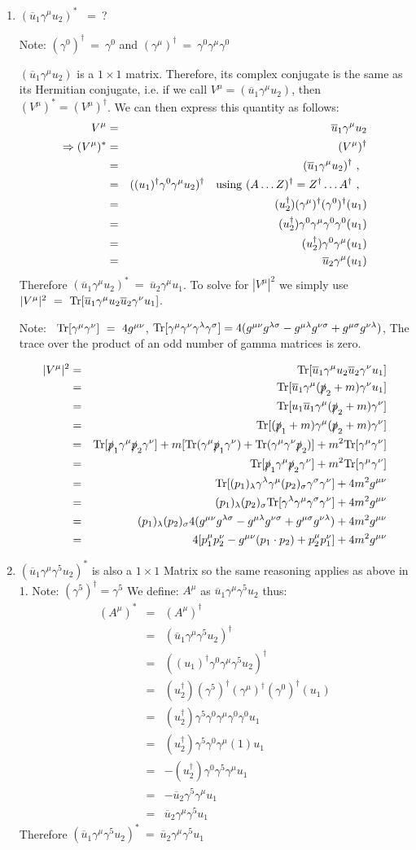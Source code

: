 \documentclass[12pt]{article}
\def \bea{\begin{eqnarray}}
\def \eea{\end{eqnarray}}
\def \Tr{{\rm Tr}}
\def \nn{\nonumber}
\def \nl{\nn \\}
\def \ou{\overline{u}}
\def \ga{\gamma}
\def \la{\lambda}
\def \si{\sigma}
\begin{document}
\begin{enumerate}

\item$(\ou_1\ga^\mu u_2)^*$ ~=~?

Note: $(\ga^0)^\dag~=~\ga^0$ and $(\ga^\mu)^\dag~=~ \ga^0\ga^\mu\ga^0$

$(\ou_1\ga^\mu u_2)$ is a $1\times1$ matrix. Therefore, its complex conjugate is the same as its Hermitian conjugate, i.e. if we call
$V^\mu = (\ou_1\ga^\mu u_2)$, then $(V^\mu)^* = (V^\mu)^\dag$. We can then express this quantity as follows:
\bea
V^\mu &=& \ou_1\ga^\mu u_2  \\
\Rightarrow (V^\mu)^* &=& (V^\mu)^\dag  \nl
&=& (\ou_1\ga^\mu u_2)^\dag ~,~~ \nl
&=& ((u_1)^\dag\ga^0\ga^\mu u_2)^\dag ~~~{\rm using}~(A\ldots Z)^\dag = Z^\dag\ldots A^\dag ~,~~ \nl
&=& (u_2^\dag)(\ga^\mu)^\dag(\ga^0)^\dag(u_1)\nl
&=& (u_2^\dag)\ga^0\ga^\mu\ga^0\ga^0(u_1)\nl
&=& (u_2^\dag)\ga^0\ga^\mu(u_1)\nl
&=& \ou_2\ga^\mu(u_1)
\eea
Therefore $(\ou_1\ga^\mu u_2)^*~=~\ou_2\ga^\mu u_1 $. To solve for $|V^\mu|^2$ we simply use $|V^\mu|^2 ~=~ \Tr[\ou_1 \ga^\mu u_2 \ou_2 \ga^\nu u_1]$.

Note: ~$\Tr[\ga^\mu\ga^\nu]~=~4 g^{\mu\nu}$, $\Tr[\ga^\mu \ga^\nu \ga^\la \ga^\si]= 4(g^{\mu\nu}g^{\la\si} - g^{\mu\la} g^{\nu\si} + g^{\mu\si}g^{\nu\la})$, The trace over the product of an odd number of gamma matrices is zero.

\bea
|V^{\mu}|^2 &=& \Tr[\ou_1 \ga^\mu u_2 \ou_2 \ga^\nu u_1] \\
&=& \Tr[\ou_1 \ga^\mu (\slashed{p}_2+m) \ga^\nu u_1]\nl
&=& \Tr[u_1\ou_1 \ga^\mu (\slashed{p}_2+m) \ga^\nu]\nl
&=& \Tr[(\slashed{p}_1+m) \ga^\mu (\slashed{p}_2+m) \ga^\nu]\nl
&=& \Tr[\slashed{p}_1\ga^\mu \slashed{p}_2 \ga^\nu] + m[\Tr(\ga^\mu \slashed{p}_1\ga^\nu) + \Tr(\ga^\mu \ga^\nu \slashed{p}_2)] + m^2\Tr[\ga^\mu \ga^\nu]\nl
&=& \Tr[\slashed{p}_1\ga^\mu \slashed{p}_2 \ga^\nu] + m^2\Tr[\ga^\mu \ga^\nu]\nl
&=& \Tr[(p_1)_\la\ga^\la \ga^\mu (p_2)_\si\ga^\si \ga^\nu  ] + 4m^2g^{\mu\nu}\nl
&=& (p_1)_\la (p_2)_\si \Tr[\ga^\la \ga^\mu\ga^\si \ga^\nu  ] + 4m^2g^{\mu\nu}\nl
&=& (p_1)_\la(p_2)_\si 4(g^{\mu\nu}g^{\la\si} - g^{\mu\la} g^{\nu\si} + g^{\mu\si}g^{\nu\la}) + 4m^2g^{\mu\nu}\nl
&=& 4[p_1^\mu p_2^\nu - g^{\mu\nu}(p_1 \cdot p_2) + p_2^\mu p_1^\nu] + 4m^2g^{\mu\nu} 
\eea

\item $(\ou_1\ga^\mu \ga^5 u_2)^*$ is also a $1\times1$ Matrix so the same reasoning applies as above in 1. Note: $(\ga^5)^\dag = \ga^5$
We define: $A^\mu$ as $\ou_1\ga^\mu\ga^5 u_2$ thus:
\bea
(A^\mu)^* &=& (A^\mu)^\dag \\
&=&(\ou_1\ga^\mu\ga^5 u_2)^\dag \nl
&=& ((u_1)^\dag\ga^0\ga^\mu\ga^5 u_2)^\dag \nl
&=& (u_2^\dag)(\ga^5)^\dag(\ga^\mu)^\dag(\ga^0)^\dag(u_1) \nl
&=& (u_2^\dag)\ga^5\ga^0\ga^\mu\ga^0\ga^0 u_1 \nl
&=& (u_2^\dag)\ga^5\ga^0\ga^\mu(1) u_1 \nl
&=& -(u_2^\dag)\ga^0\ga^5\ga^\mu u_1 \nl
&=& -\ou_2\ga^5\ga^\mu u_1 \nl
&=& \ou_2\ga^\mu\ga^5 u_1
\eea
%
Therefore $(\ou_1\ga^\mu \ga^5 u_2)^*~=~\ou_2 \ga^\mu \ga^5 u_1$


\end{enumerate}
\end{document}
